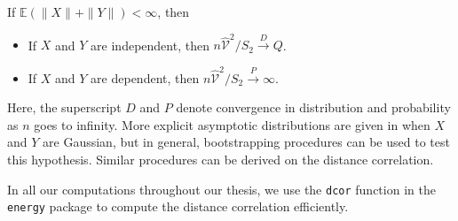 \begin{prop}
If $\mathbb{E}(\|X\| +\|Y\|)< \infty$, then
\begin{itemize}
\item If $X$ and $Y$ are independent, then $n\widehat{\mathcal{V}}^2/S_2 \overset{D}{\rightarrow} Q$.
\item If $X$ and $Y$ are dependent, then $n\widehat{\mathcal{V}}^2/S_2 \overset{P}{\rightarrow} \infty$.
\end{itemize}
\end{prop}

Here, the superscript $D$ and $P$ denote convergence in distribution and probability as $n$ goes to infinity.
More explicit asymptotic distributions are given in \cite{szekely2013energy} when $X$ and $Y$ are Gaussian, but
in general, bootstrapping procedures can be used to test this hypothesis. Similar procedures can be derived
on the distance correlation.

In all our computations throughout our thesis, we use the \texttt{dcor} function in the
\texttt{energy} package to compute the distance correlation efficiently.
